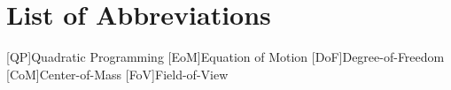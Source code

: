  \noindent
\chapter*{List of Abbreviations}
\begin{acronym}
	[QP]{Quadratic Programming}
	[EoM]{Equation of Motion}
	[DoF]{Degree-of-Freedom}
	[CoM]{Center-of-Mass}
	[FoV]{Field-of-View}
\end{acronym}

